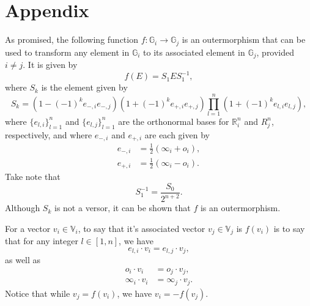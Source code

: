 \documentclass{ecgd-l}
\theoremstyle{definition}
\theoremstyle{remark}
\numberwithin{equation}{section}
\newcommand{\R}{\mathbb{R}}
\newcommand{\G}{\mathbb{G}}
\newcommand{\V}{\mathbb{V}}
\newcommand{\nvai}{\infty}
\newcommand{\nvao}{o}
\begin{document}
\section{Appendix}

As promised, the following function $f:\G_i\to\G_j$ is an outermorphism that can be used
to transform any element in $\G_i$ to its associated element in $\G_j$, provided $i\neq j$.
It is given by
\begin{equation*}
f(E) = S_1ES_1^{-1},
\end{equation*}
where $S_k$ is the element given by
\begin{equation*}
S_k = (1-(-1)^k e_{-,i}e_{-,j})(1+(-1)^k e_{+,i}e_{+,j})\prod_{l=1}^n(1+(-1)^k e_{l,i}e_{l,j}),
\end{equation*}
where $\{e_{l,i}\}_{l=1}^n$ and $\{e_{l,j}\}_{l=1}^n$ are the orthonormal bases for $\R_i^n$ and $R_j^n$, respectively,
and where $e_{-,i}$ and $e_{+,i}$ are each given by
\begin{align*}
e_{-,i} &= \frac{1}{2}(\nvai_i+\nvao_i),\\
e_{+,i} &= \frac{1}{2}(\nvai_i-\nvao_i).
\end{align*}
Take note that
\begin{equation*}
S_1^{-1} = \frac{S_0}{2^{n+2}}.
\end{equation*}
Although $S_k$ is not a versor, it can be shown that $f$ is an outermorphism.

For a vector $v_i\in\V_i$, to say that it's associated vector $v_j\in\V_j$ is $f(v_i)$ is to say
that for any integer $l\in[1,n]$, we have
\begin{equation*}
e_{l,i}\cdot v_i = e_{l,j}\cdot v_j,
\end{equation*}
as well as
\begin{align*}
\nvao_i\cdot v_i &= \nvao_j\cdot v_j,\\
\nvai_i\cdot v_i &= \nvai_j\cdot v_j.
\end{align*}
Notice that while $v_j=f(v_i)$, we have $v_i = -f(v_j)$.



\end{document}
